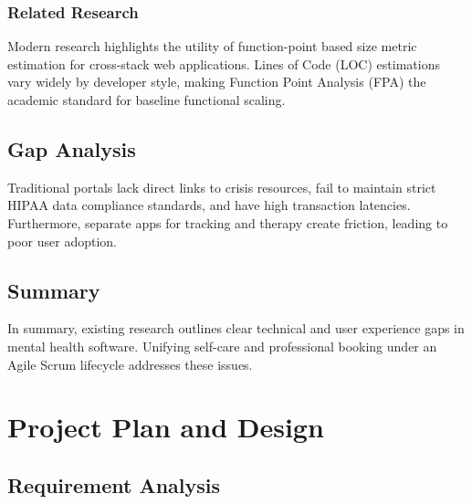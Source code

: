 \documentclass[a4paper,11pt]{report}
\begin{document}
\subsection{Related Research}
Modern research highlights the utility of function-point based size metric estimation for cross-stack web applications. Lines of Code (LOC) estimations vary widely by developer style, making Function Point Analysis (FPA) the academic standard for baseline functional scaling.

\section{Gap Analysis}
Traditional portals lack direct links to crisis resources, fail to maintain strict HIPAA data compliance standards, and have high transaction latencies. Furthermore, separate apps for tracking and therapy create friction, leading to poor user adoption.

\section{Summary}
In summary, existing research outlines clear technical and user experience gaps in mental health software. Unifying self-care and professional booking under an Agile Scrum lifecycle addresses these issues.

\chapter{Project Plan and Design}

\section{Requirement Analysis}
\end{document}
